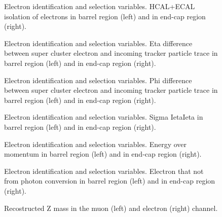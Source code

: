 \documentclass[12pt]{article} %
\begin{document}
\begin{figure}[H] %
  \caption{Electron identification and selection variables. HCAL+ECAL isolation of electrons in barrel region (left) and in end-cap region (right).}
  \label{fig:eleVariable08}
\end{figure}

\begin{figure}[H] %
  \caption{Electron identification and selection variables. Eta difference between super cluster electron and incoming tracker particle trace in barrel region (left) and in end-cap region (right).}
  \label{fig:eleVariable09}
\end{figure}

\begin{figure}[H] %
  \caption{Electron identification and selection variables. Phi difference between super cluster electron and incoming tracker particle trace in barrel region (left) and in end-cap region (right).}
  \label{fig:eleVariable10}
\end{figure}

\begin{figure}[H] %
  \caption{Electron identification and selection variables. Sigma IetaIeta in barrel region (left) and in end-cap region (right).}
  \label{fig:eleVariable11}
\end{figure}

\begin{figure}[H] %
  \caption{Electron identification and selection variables. Energy over momentum in barrel region (left) and in end-cap region (right).}
  \label{fig:eleVariable12}
\end{figure}

\begin{figure}[H] %
  \caption{Electron identification and selection variables. Electron that not from photon conversion in barrel region (left) and in end-cap region (right).}
  \label{fig:eleVariable13}
\end{figure}

\begin{figure}[H] %
  \caption{Recostructed Z mass in the muon (left) and electron (right) channel.}
  \label{fig:dilepMass}
\end{figure}
\end{document}
